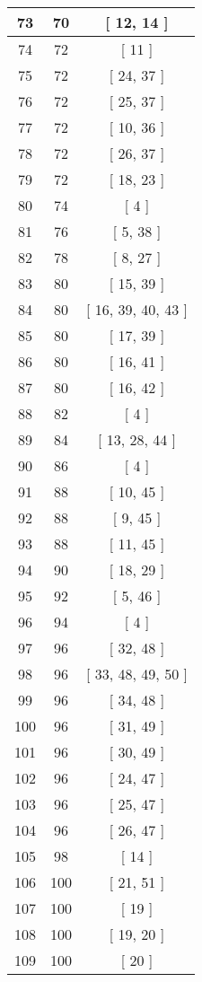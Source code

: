 \begin{center}
\begin{longtable}[H]{|| c c c ||}
73 & 70 & [ 12, 14 ] \\ 
\hline
74 & 72 & [ 11 ] \\ 
\hline
75 & 72 & [ 24, 37 ] \\ 
\hline
76 & 72 & [ 25, 37 ] \\ 
\hline
77 & 72 & [ 10, 36 ] \\ 
\hline
78 & 72 & [ 26, 37 ] \\ 
\hline
79 & 72 & [ 18, 23 ] \\ 
\hline
80 & 74 & [ 4 ] \\ 
\hline
81 & 76 & [ 5, 38 ] \\ 
\hline
82 & 78 & [ 8, 27 ] \\ 
\hline
83 & 80 & [ 15, 39 ] \\ 
\hline
84 & 80 & [ 16, 39, 40, 43 ] \\ 
\hline
85 & 80 & [ 17, 39 ] \\ 
\hline
86 & 80 & [ 16, 41 ] \\ 
\hline
87 & 80 & [ 16, 42 ] \\ 
\hline
88 & 82 & [ 4 ] \\ 
\hline
89 & 84 & [ 13, 28, 44 ] \\ 
\hline
90 & 86 & [ 4 ] \\ 
\hline
91 & 88 & [ 10, 45 ] \\ 
\hline
92 & 88 & [ 9, 45 ] \\ 
\hline
93 & 88 & [ 11, 45 ] \\ 
\hline
94 & 90 & [ 18, 29 ] \\ 
\hline
95 & 92 & [ 5, 46 ] \\ 
\hline
96 & 94 & [ 4 ] \\ 
\hline
97 & 96 & [ 32, 48 ] \\ 
\hline
98 & 96 & [ 33, 48, 49, 50 ] \\ 
\hline
99 & 96 & [ 34, 48 ] \\ 
\hline
100 & 96 & [ 31, 49 ] \\ 
\hline
101 & 96 & [ 30, 49 ] \\ 
\hline
102 & 96 & [ 24, 47 ] \\ 
\hline
103 & 96 & [ 25, 47 ] \\ 
\hline
104 & 96 & [ 26, 47 ] \\ 
\hline
105 & 98 & [ 14 ] \\ 
\hline
106 & 100 & [ 21, 51 ] \\ 
\hline
107 & 100 & [ 19 ] \\ 
\hline
108 & 100 & [ 19, 20 ] \\ 
\hline
109 & 100 & [ 20 ] \\ 

\end{longtable}
\end{center}
